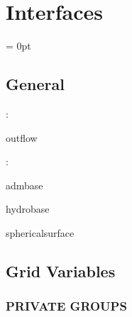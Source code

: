 
\section{Interfaces} 


\parskip = 0pt

\vspace{3mm} \subsection*{General}

: 

outflow
\vspace{2mm}

: 

admbase

hydrobase

sphericalsurface
\vspace{2mm}
\subsection*{Grid Variables}
\vspace{5mm}\subsubsection{PRIVATE GROUPS}

\vspace{5mm}

